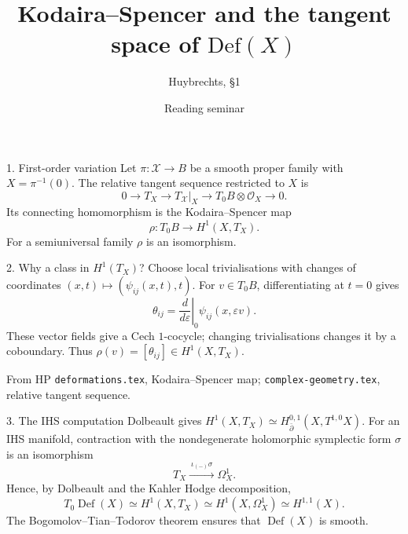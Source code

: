 \documentclass[aspectratio=169]{beamer}
\title{Kodaira--Spencer and the tangent space of $\mathrm{Def}(X)$}
\subtitle{Huybrechts, \S1}
\date{Reading seminar}
\begin{document}
\begin{frame}\titlepage\end{frame}
\begin{frame}{1. First-order variation}
Let $\pi:\mathcal X\to B$ be a smooth proper family with $X=\pi^{-1}(0)$.
The relative tangent sequence restricted to $X$ is
\[
0\to T_X\to T_{\mathcal X}|_X\to
T_0B\otimes\mathcal O_X\to0.
\]
Its connecting homomorphism is the Kodaira--Spencer map
\[
\rho:T_0B\to H^1(X,T_X).
\]
For a semiuniversal family $\rho$ is an isomorphism.
\end{frame}
\begin{frame}{2. Why a class in $H^1(T_X)$?}
Choose local trivialisations with changes of coordinates
$(x,t)\mapsto(\psi_{ij}(x,t),t)$.
For $v\in T_0B$, differentiating at $t=0$ gives
\[
\theta_{ij}=\left.\frac d{d\varepsilon}\right|_0
\psi_{ij}(x,\varepsilon v).
\]
These vector fields give a Cech $1$-cocycle;
changing trivialisations changes it by a coboundary.
Thus $\rho(v)=[\theta_{ij}]\in H^1(X,T_X)$.
\smallskip

{\scriptsize From HP \texttt{deformations.tex}, Kodaira--Spencer map;
\texttt{complex-geometry.tex}, relative tangent sequence.}
\end{frame}
\begin{frame}{3. The IHS computation}
Dolbeault gives $H^1(X,T_X)\simeq
H_{\bar\partial}^{0,1}(X,T^{1,0}X)$.
For an IHS manifold, contraction with the nondegenerate
holomorphic symplectic form $\sigma$ is an isomorphism
\[
T_X\xrightarrow{\ \iota_{(-)}\sigma\ }\Omega_X^1.
\]
Hence, by Dolbeault and the Kahler Hodge decomposition,
\[
\boxed{T_0\operatorname{Def}(X)
\simeq H^1(X,T_X)\simeq H^1(X,\Omega_X^1)
\simeq H^{1,1}(X).}
\]
The Bogomolov--Tian--Todorov theorem ensures that
$\operatorname{Def}(X)$ is smooth.
\end{frame}
\end{document}
